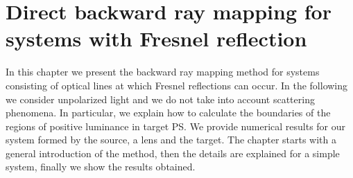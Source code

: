 \chapter{Direct backward ray mapping for systems with Fresnel reflection}
\label{chap:fresnel}
In this chapter we present the backward ray mapping method for systems consisting of optical lines at which Fresnel reflections can occur. In the following we consider unpolarized light and we do not take into account scattering phenomena. In particular, we explain how to calculate the boundaries of the regions of positive luminance in target PS. We provide numerical results for our system formed by the source, a lens and the target. 
The chapter starts with a general introduction of the method, then the details are explained for a simple system, finally we show the results obtained.
